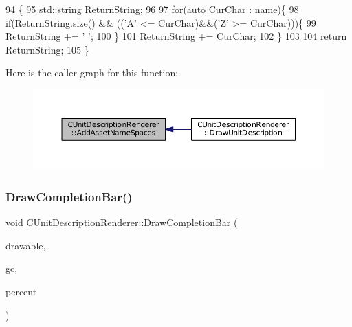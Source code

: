 \begin{DoxyCode}
94                                                                            \{
95     std::string ReturnString;
96     
97     \textcolor{keywordflow}{for}(\textcolor{keyword}{auto} CurChar : name)\{
98         \textcolor{keywordflow}{if}(ReturnString.size() && ((\textcolor{charliteral}{'A'} <= CurChar)&&(\textcolor{charliteral}{'Z'} >= CurChar)))\{
99             ReturnString += \textcolor{charliteral}{' '};   
100         \}
101         ReturnString += CurChar;
102     \}
103     
104     \textcolor{keywordflow}{return} ReturnString;
105 \}
\end{DoxyCode}
Here is the caller graph for this function\+:\nopagebreak
\begin{figure}[H]
\begin{center}
\leavevmode
\includegraphics[width=350pt]{classCUnitDescriptionRenderer_ae18d6862ae305bd5633558f86457270b_icgraph}
\end{center}
\end{figure}
\hypertarget{classCUnitDescriptionRenderer_a1faaa0097504c0ccf2f8017449324377}{}\label{classCUnitDescriptionRenderer_a1faaa0097504c0ccf2f8017449324377} 
\subsubsection{\texorpdfstring{Draw\+Completion\+Bar()}{DrawCompletionBar()}}
{\footnotesize\ttfamily void C\+Unit\+Description\+Renderer\+::\+Draw\+Completion\+Bar (\begin{DoxyParamCaption}\item[{Gdk\+Drawable $\ast$}]{drawable,  }\item[{Gdk\+GC $\ast$}]{gc,  }\item[{int}]{percent }\end{DoxyParamCaption})\hspace{0.3cm}{\ttfamily [protected]}}



